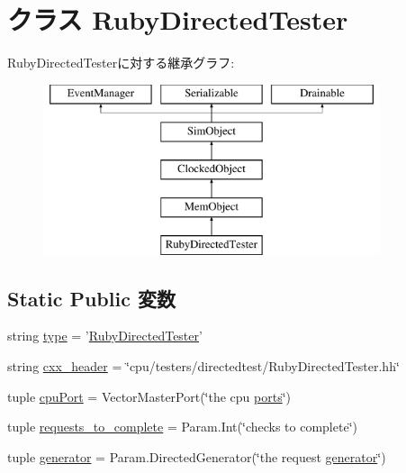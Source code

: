\hypertarget{classRubyDirectedTester_1_1RubyDirectedTester}{
\section{クラス RubyDirectedTester}
\label{classRubyDirectedTester_1_1RubyDirectedTester}
}
RubyDirectedTesterに対する継承グラフ:\begin{figure}[H]
\begin{center}
\leavevmode
\includegraphics[height=5cm]{classRubyDirectedTester_1_1RubyDirectedTester}
\end{center}
\end{figure}
\subsection*{Static Public 変数}
\begin{DoxyCompactItemize}
\item 
string \hyperlink{classRubyDirectedTester_1_1RubyDirectedTester_acce15679d830831b0bbe8ebc2a60b2ca}{type} = '\hyperlink{classRubyDirectedTester_1_1RubyDirectedTester}{RubyDirectedTester}'
\item 
string \hyperlink{classRubyDirectedTester_1_1RubyDirectedTester_a17da7064bc5c518791f0c891eff05fda}{cxx\_\-header} = \char`\"{}cpu/testers/directedtest/RubyDirectedTester.hh\char`\"{}
\item 
tuple \hyperlink{classRubyDirectedTester_1_1RubyDirectedTester_ace8800036ae574a5768b4b672759f660}{cpuPort} = VectorMasterPort(\char`\"{}the cpu \hyperlink{classRubyDirectedTester_a9b3aedb8e244949f057468d6ba55c41a}{ports}\char`\"{})
\item 
tuple \hyperlink{classRubyDirectedTester_1_1RubyDirectedTester_a78128ad1f6c5983bd9089fa4090c7114}{requests\_\-to\_\-complete} = Param.Int(\char`\"{}checks to complete\char`\"{})
\item 
tuple \hyperlink{classRubyDirectedTester_1_1RubyDirectedTester_a0227bb2583fecef99335cf93d701a476}{generator} = Param.DirectedGenerator(\char`\"{}the request \hyperlink{classRubyDirectedTester_1_1RubyDirectedTester_a0227bb2583fecef99335cf93d701a476}{generator}\char`\"{})
\end{DoxyCompactItemize}


